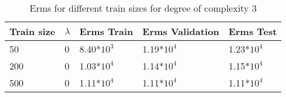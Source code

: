 \def\arraystretch{1.25}
\begin{table}[H]
\centering
\begin{tabular}{l l l l l}
\hline
\hline
\textbf{Train size} & \textbf{$\lambda$} & \textbf{Erms Train} & \textbf{Erms Validation} & \textbf{Erms Test}\\
\hline
\hline
50 & 0 & 8.40*$10^3$ & 1.19*$10^4$ & 1.23*$10^4$  \\
200 & 0 & 1.03*$10^4$ & 1.14*$10^4$ & 1.15*$ 10^4$  \\
500 & 0 & 1.11*$10^4$ & 1.11*$10^4$ & 1.11*$10^4$\\
\hline
\end{tabular}
\caption{Erms for different train sizes for degree of complexity 3}
\end{table}

